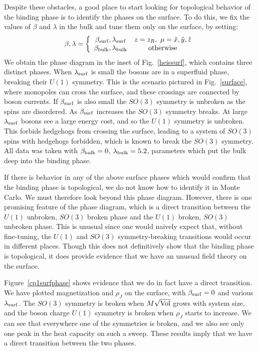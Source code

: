 \documentclass[prb,twocolumn]{revtex4-1}
\begin{document}
Despite these obstacles, a good place to start looking for topological behavior of the binding phase is to identify the phases on the surface. To do this, we fix the values of $\beta$ and $\lambda$ in the bulk and tune them only on the surface, by setting:
\begin{equation}
\beta,\lambda=\left\{
\begin{array}{cc}
\beta_{\rm surf},\lambda_{\rm surf} & z=z_R,~\mu=\hat{x},\hat{y},\hat{z}\\
\beta_{\rm bulk},\lambda_{\rm bulk} & {\rm otherwise }
\end{array}\right.
\label{bulkvsurf}
\end{equation}
We obtain the phase diagram in the inset of Fig.~\ref{heissurf}, which contains three distinct phases. When $\lambda_{\rm surf}$ is small the bosons are in a superfluid phase, breaking their $U(1)$ symmetry. This is the scenario pictured in Fig.~\ref{surface}, where monopoles can cross the surface, and these crossings are connected by boson currents. If $\beta_{\rm surf}$ is also small the $SO(3)$ symmetry is unbroken as the spins are disordered. As $\beta_{\rm surf}$ increases the $SO(3)$ symmetry breaks. At large $\lambda_{\rm surf}$ bosons see a large energy cost, and so the $U(1)$ symmetry is unbroken. This forbids hedgehogs from crossing the surface, leading to a system of $SO(3)$ spins with hedgehogs forbidden, which is known to break the $SO(3)$ symmetry.\cite{LauDasgupta} All data was taken with $\beta_{\rm bulk}=0$, $\lambda_{\rm bulk}=5.2$, parameters which put the bulk deep into the binding phase.

If there is behavior in any of the above surface phases which would confirm that the binding phase is topological, we do not know how to identify it in Monte Carlo. We must therefore look beyond this phase diagram. However, there is one promising feature of the phase diagram, which is a direct transition between the $U(1)$ unbroken, $SO(3)$ broken phase and the $U(1)$ broken, $SO(3)$ unbroken phase. This is unusual since one would naively expect that, without fine-tuning, the $U(1)$ and $SO(3)$ symmetry-breaking transitions would occur in different places. Though this does not definitively show that the binding phase is topological, it does provide evidence that we have an unusual field theory on the surface. 

Figure~\ref{cp1surfphase} shows evidence that we do in fact have a direct transition. We have plotted magnetization and $\rho_J$ on the surface, with $\beta_{\rm surf}=0$ and various $\lambda_{\rm surf}$. The $SO(3)$ symmetry is broken when $M\sqrt{\rm Vol}$ grows with system size, and the boson charge $U(1)$ symmetry is broken when $\rho_J$ starts to increase. We can see that everywhere one of the symmetries is broken, and we also see only one peak in the heat capacity on such a sweep. These results imply that we have a direct transition between the two phases.
\end{document}
